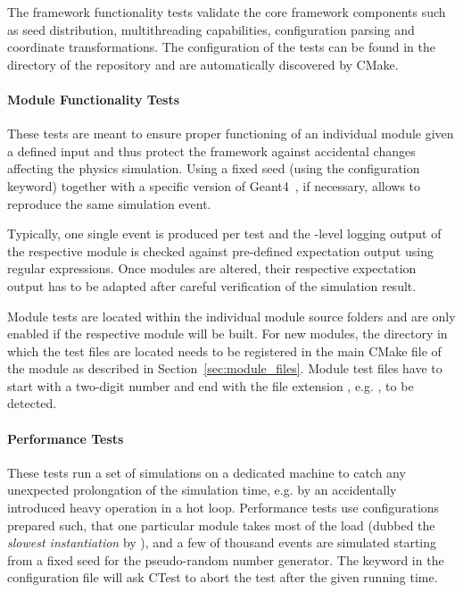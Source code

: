 The framework functionality tests validate the core framework components such as seed distribution, multithreading capabilities, configuration parsing and coordinate transformations. The configuration of the tests can be found in the  directory of the repository and are automatically discovered by CMake.

\paragraph{Module Functionality Tests}

These tests are meant to ensure proper functioning of an individual module given a defined input and thus protect the framework against accidental changes affecting the physics simulation.
Using a fixed seed (using the  configuration keyword) together with a specific version of Geant4~\cite{geant4}, if necessary, allows to reproduce the same simulation event.

Typically, one single event is produced per test and the -level logging output of the respective module is checked against pre-defined expectation output using regular expressions.
Once modules are altered, their respective expectation output has to be adapted after careful verification of the simulation result.

Module tests are located within the individual module source folders and are only enabled if the respective module will be built. For new modules, the directory in which the test files are located needs to be registered in the main CMake file of the module as described in Section~\ref{sec:module_files}. Module test files have to start with a two-digit number and end with the file extension , e.g. , to be detected.

\paragraph{Performance Tests}

These tests run a set of simulations on a dedicated machine to catch any unexpected prolongation of the simulation time, e.g. by an accidentally introduced heavy operation in a hot loop.
Performance tests use configurations prepared such, that one particular module takes most of the load (dubbed the \emph{slowest instantiation} by \apsq), and a few of thousand events are simulated starting from a fixed seed for the pseudo-random number generator.
The  keyword in the configuration file will ask CTest to abort the test after the given running time.

